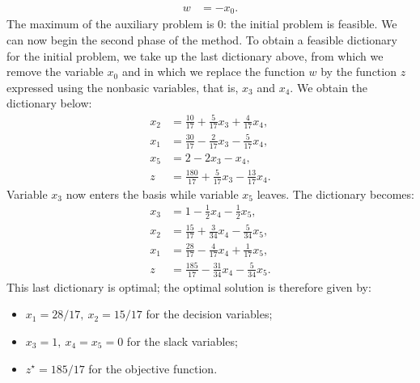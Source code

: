 \begin{example}
\[\begin{aligned}
        \hline
        w &= -x_0.
        \end{aligned}
    \]
    The maximum of the auxiliary problem is \(0\): the initial problem is feasible. We can now begin the second phase of the method. To obtain a feasible dictionary for the initial problem, we take up the last dictionary above, from which we remove the variable \(x_0\) and in which we replace the function \(w\) by the function \(z\) expressed using the nonbasic variables, that is, \(x_3\) and \(x_4\). We obtain the dictionary below:
    \[
        \begin{aligned}
        x_2 &= \tfrac{10}{17} + \tfrac{5}{17}x_3 + \tfrac{4}{17}x_4,\\
        x_1 &= \tfrac{30}{17} - \tfrac{2}{17}x_3 - \tfrac{5}{17}x_4,\\
        x_5 &= 2 - 2x_3 - x_4,\\
        \hline
        z &= \tfrac{180}{17} + \tfrac{5}{17}x_3 - \tfrac{13}{17}x_4.
        \end{aligned}
    \]
    Variable \(x_3\) now enters the basis while variable \(x_5\) leaves. The dictionary becomes:
    \[
        \begin{aligned}
        x_3 &= 1 - \tfrac{1}{2}x_4 - \tfrac{1}{2}x_5,\\
        x_2 &= \tfrac{15}{17} + \tfrac{3}{34}x_4 - \tfrac{5}{34}x_5,\\
        x_1 &= \tfrac{28}{17} - \tfrac{4}{17}x_4 + \tfrac{1}{17}x_5,\\
        \hline
        z &= \tfrac{185}{17} - \tfrac{31}{34}x_4 - \tfrac{5}{34}x_5.
        \end{aligned}
    \]
    This last dictionary is optimal; the optimal solution is therefore given by:
    \begin{itemize}
    \item \(x_1 = 28/17,\ x_2 = 15/17\) for the decision variables;
    \item \(x_3 = 1,\ x_4 = x_5 = 0\) for the slack variables;
    \item \(z^\star = 185/17\) for the objective function.
    \end{itemize}
\end{example}

